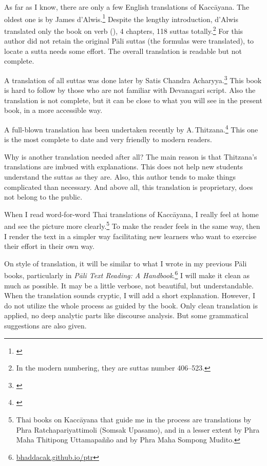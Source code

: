 As far as I know, there are only a few English translations of Kaccāyana. The oldest one is by James d'Alwis.\footnote{\citealp{dalwis:kach}} Despite the lengthy introduction, d'Alwis translated only the book on verb (), 4 chapters, 118 suttas totally.\footnote{In the modern numbering, they are suttas number 406--523.} For this author did not retain the original Pāli suttas (the formulas were translated), to locate a sutta needs some effort. The overall translation is readable but not complete.

A translation of all suttas was done later by Satis Chandra Acharyya.\footnote{\citealp{satis:kacc}} This book is hard to follow by those who are not familiar with Devanagari script. Also the translation is not complete, but it can be close to what you will see in the present book, in a more accessible way.

A full-blown translation has been undertaken recently by A.\,Thitzana.\footnote{\citealp{thitzana:kacc2}} This one is the most complete to date and very friendly to modern readers.

Why is another translation needed after all? The main reason is that Thitzana's translations are imbued with explanations. This does not help new students understand the suttas as they are. Also, this author tends to make things complicated than necessary. And above all, this translation is proprietary, does not belong to the public.

When I read word-for-word Thai translations of Kaccāyana, I really feel at home and see the picture more clearly.\footnote{Thai books on Kaccāyana that guide me in the process are translations by Phra Ratchapariyattimoli (Somsak Upasamo), and in a lesser extent by Phra Maha Thitipong Uttamapañño and by Phra Maha Sompong Mudito.} To make the reader feels in the same way, then I render the text in a simpler way facilitating new learners who want to exercise their effort in their own way.

On style of translation, it will be similar to what I wrote in my previous Pāli books, particularly in \emph{Pāli Text Reading: A Handbook}.\footnote{\url{bhaddacak.github.io/ptr}} I will make it clean as much as possible. It may be a little verbose, not beautiful, but understandable. When the translation sounds cryptic, I will add a short explanation. However, I do not utilize the whole process as guided by the book. Only clean translation is applied, no deep analytic parts like discourse analysis. But some grammatical suggestions are also given.

